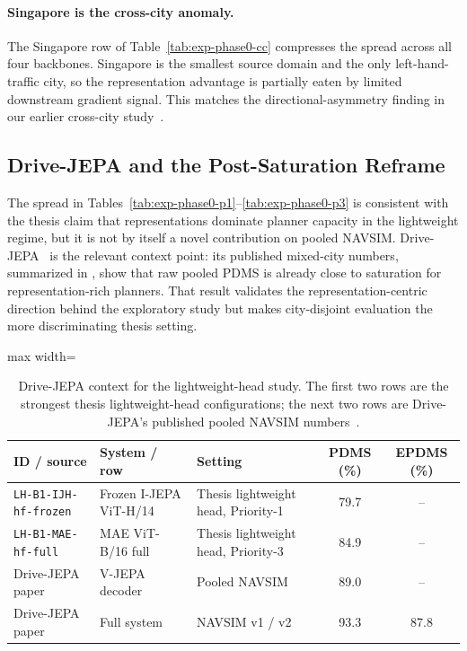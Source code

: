 \paragraph{Singapore is the cross-city anomaly.} The Singapore row of Table~\ref{tab:exp-phase0-cc} compresses the spread across all four backbones. Singapore is the smallest source domain and the only left-hand-traffic city, so the representation advantage is partially eaten by limited downstream gradient signal. This matches the directional-asymmetry finding in our earlier cross-city study~\cite{naeinian-cross-city-2026}.

\subsection{Drive-JEPA and the Post-Saturation Reframe}
\label{sec:exp-phase0-drivejepa}

The spread in Tables~\ref{tab:exp-phase0-p1}--\ref{tab:exp-phase0-p3} is consistent with the thesis claim that representations dominate planner capacity in the lightweight regime, but it is not by itself a novel contribution on pooled NAVSIM. Drive-JEPA~\cite{wang-drive-jepa} is the relevant context point: its published mixed-city numbers, summarized in , show that raw pooled PDMS is already close to saturation for representation-rich planners. That result validates the representation-centric direction behind the exploratory study but makes city-disjoint evaluation the more discriminating thesis setting.

\begin{table}[ht]
\centering
\caption[Drive-JEPA context: thesis lightweight-head rows vs.\ published Drive-JEPA.]{Drive-JEPA context for the lightweight-head study. The first two rows are the strongest thesis lightweight-head configurations; the next two rows are Drive-JEPA's published pooled NAVSIM numbers~\cite{wang-drive-jepa}.}
\label{tab:exp-drivejepa-context}
\footnotesize
\renewcommand{\arraystretch}{1.15}
\setlength{\tabcolsep}{5pt}
\begin{adjustbox}{max width=\textwidth}
\begin{tabular}{@{}lllcc@{}}
\toprule
\textbf{ID / source} & \textbf{System / row} & \textbf{Setting} & \textbf{PDMS (\%)} & \textbf{EPDMS (\%)} \\
\midrule
\texttt{LH-B1-IJH-hf-frozen} & Frozen I-JEPA ViT-H/14 & Thesis lightweight head, Priority-1 & 79.7 & -- \\
\texttt{LH-B1-MAE-hf-full} & MAE ViT-B/16 full & Thesis lightweight head, Priority-3 & 84.9 & -- \\
Drive-JEPA paper & V-JEPA decoder & Pooled NAVSIM & 89.0 & -- \\
Drive-JEPA paper & Full system & NAVSIM v1 / v2 & 93.3 & 87.8 \\
\bottomrule
\end{tabular}
\end{adjustbox}
\end{table}

